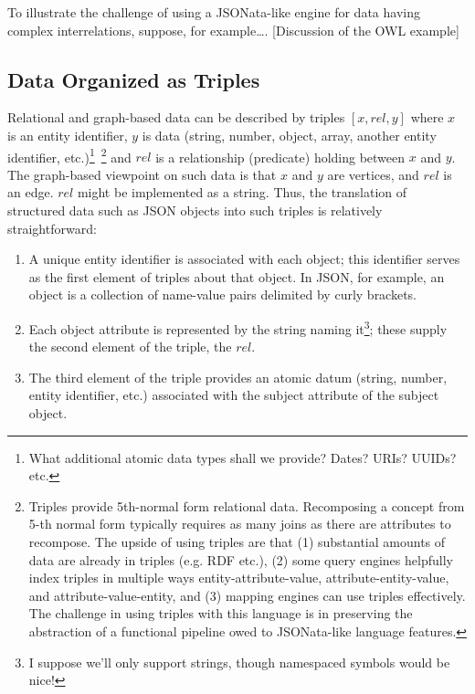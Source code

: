 \documentclass[9pt,letterpaper]{article}
\begin{document}
 
To illustrate the challenge of using a JSONata-like engine for data having complex interrelations, suppose, for example\ldots. [Discussion of the OWL example]

\subsection{Data Organized as Triples}
Relational and graph-based data can be described by triples $[x,rel,y]$ where $x$ is an entity identifier, $y$ is data (string, number, object, array, another entity identifier, etc.)\footnote{What  additional atomic data
  types shall we provide? Dates? URIs? UUIDs? etc.}~\footnote{Triples provide 5th-normal form relational data. Recomposing a concept from 5-th normal form typically requires as many joins as
  there are attributes to recompose.
  The upside of using triples are that
  (1) substantial amounts of data are already in triples (e.g. RDF etc.),
  (2) some query engines helpfully index triples in multiple ways entity-attribute-value, attribute-entity-value, and attribute-value-entity, and
  (3) mapping engines can use triples effectively.
  The challenge in using triples with this language is in preserving the abstraction of a functional pipeline owed to JSONata-like language features.}
and $rel$ is a relationship (predicate) holding between $x$ and $y$.
The graph-based viewpoint on such data is that $x$ and $y$ are vertices, and $rel$ is an edge.
$rel$ might be implemented as a string.
Thus, the translation of structured data such as JSON objects into such triples is relatively straightforward:
\begin{enumerate}
\item A unique entity identifier is associated with each object; this identifier serves as the first element of triples about that object.
      In JSON, for example, an object is a collection of name-value pairs delimited by curly brackets.
\item Each object attribute is represented by the string naming it\footnote{I suppose we'll only support strings, though namespaced symbols would be nice!}; these supply the second element of the triple, the $rel$.
\item The third element of the triple provides an atomic datum (string, number, entity identifier, etc.) associated with the subject attribute of the subject object.
\end{enumerate}
\end{document}
